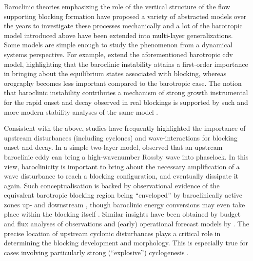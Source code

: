 Baroclinic theories emphasizing the role of the vertical structure of the
flow supporting blocking formation have proposed a variety of abstracted
models over the years to investigate these processes mechanically
\parencite[e.g.~][]{vautardSourceMidlatitudeLowfrequency1988,
    tanakaNumericalSimulationAmplification1991,
    cessiOrographicInstabilityNonsymmetric1985,
    marshallDynamicalUnderstandingPlanetaryScale1993} and a lot of the
barotropic
model introduced above have been extended into multi-layer generalizations.
Some models are simple enough to study the phenomenon from a dynamical systems
perspective. For example, \textcite{charneyFormdragInstabilityMultiple1980}
extend the aforementioned barotropic \gls{cdv} model,
highlighting that the baroclinic
instability attains a first-order importance in bringing about the equilibrium
states associated with blocking, whereas orography becomes less important
compared to the barotropic case. The notion that baroclinic instability
contributes a mechanism of strong growth instrumental for the rapid
onset and decay observed in real blockings is supported by such and more modern
stability analyses of the same model
\parencite{schubertCovariantLyapunovVectors2015,
    schubertDynamicalAnalysisBlocking2016}.

Consistent with the above, studies have frequently highlighted the
importance of upstream disturbances (including cyclones) and wave-interactions
for blocking onset and decay. In a simple two-layer model,
\textcite{luoPlanetaryscaleBaroclinicEnvelope2000} observed that an upstream
baroclinic eddy can bring a high-wavenumber Rossby wave into phaselock. In this
view, baroclinicity is important to bring about the necessary amplification of
a wave disturbance to reach a blocking configuration, and eventually
dissipate it again. Such conceptualisation is backed by observational evidence
of the equivalent barotropic blocking region being \enquote{enveloped} by
baroclinically active zones up- and downstream
\parencite{frederiksenOnsetBlockingCyclogenesis1984,
    nakamuraObservedChangesBaroclinic1990, mullerUsingConceptDynamic2019},
though baroclinic energy conversions may even take place within the
blocking itself \parencite{martineauBaroclinicBlocking2022}.
Similar insights have been obtained by
budget and flux analyses of observations and (early) operational forecast
models by \textcite{mullenLocalBalancesVorticity1986,
    mullenTransientEddyForcing1987}. The precise location of upstream cyclonic
disturbances plays a critical role in determining the blocking development and
morphology. This is especially true for cases involving particularly strong
(\enquote{explosive}) cyclogenesis
\parencite{colucciExplosiveCyclogenesisLargescale1985}.

